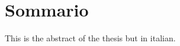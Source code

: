 \chapter{Sommario}
\label{Sommario}
\thispagestyle{empty}


This is the abstract of the thesis but in italian.
